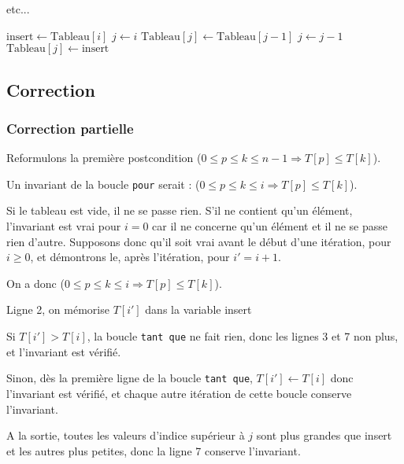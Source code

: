 \begin{center}
\begin{minipage}{12.5cm}
{\vspace{-0.5cm}
etc...
\par}\end{minipage}

\begin{algorithm}[H]
{ $\text{insert}\leftarrow\text{Tableau}[i]$\;
  $j\leftarrow i$\;
  {   $\text{Tableau}[j]\leftarrow\text{Tableau}[j-1]$\;
      $j\leftarrow j-1$\;
  }
  $\text{Tableau}[j]\leftarrow\text{insert}$\;
}
\end{algorithm}
\end{center}

\subsection{Correction}

\subsubsection{Correction partielle}

Reformulons la première postcondition ($0 \leqslant p\leqslant k \leqslant n-1 \Rightarrow T[p]\leqslant T[k]$).

Un invariant de la boucle \texttt{pour} serait : ($0 \leqslant p\leqslant k \leqslant i \Rightarrow T[p]\leqslant T[k]$).

Si le tableau est vide, il ne se passe rien. S'il ne contient qu'un élément, l'invariant est vrai pour $i=0$ car il ne concerne qu'un élément et il ne se passe rien d'autre. Supposons donc qu'il soit vrai avant le début d'une itération, pour $i\geqslant0$, et démontrons le, après l'itération, pour $i'=i+1$.



On a donc ($0 \leqslant p\leqslant k \leqslant i \Rightarrow T[p]\leqslant T[k]$).

Ligne 2, on mémorise  $T[i']$ dans la variable insert

Si $T[i']>T[i]$, la boucle \texttt{tant que} ne fait rien, donc les lignes 3 et 7 non plus, et l'invariant est vérifié.

Sinon, dès la première ligne de la boucle \texttt{tant que}, $T[i']\leftarrow T[i]$ donc l'invariant est vérifié, et chaque autre itération de cette boucle conserve l'invariant.

A la sortie, toutes les valeurs d'indice supérieur à $j$ sont plus grandes que insert et les autres plus petites, donc la ligne 7 conserve l'invariant.

